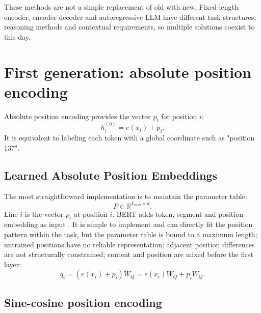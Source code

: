 \documentclass[UTF8,fontset=none,a4paper,10pt]{ctexart}
\newcommand{\R}{\mathbb{R}}
\begin{document}
These methods are not a simple replacement of old with new. Fixed-length encoder, encoder-decoder and autoregressive LLM have different task structures, reasoning methods and contextual requirements, so multiple solutions coexist to this day.

\section{First generation: absolute position encoding}

Absolute position encoding provides the vector $p_i$ for position $i$:
\begin{equation}
  h_i^{(0)}=e(x_i)+p_i.
  \label{en:eq:absolute}
\end{equation}
It is equivalent to labeling each token with a global coordinate such as "position 137".

\subsection{Learned Absolute Position Embeddings}

The most straightforward implementation is to maintain the parameter table:
\begin{equation}
  P\in\R^{L_{\max}\times d}.
  \label{en:eq:learned-table}
\end{equation}
Line $i$ is the vector $p_i$ at position $i$. BERT adds token, segment and position embedding as input \cite{en:devlin2019}. It is simple to implement and can directly fit the position pattern within the task, but the parameter table is bound to a maximum length; untrained positions have no reliable representation; adjacent position differences are not structurally constrained; content and position are mixed before the first layer:
\begin{equation}
  q_i=(e(x_i)+p_i)W_Q=e(x_i)W_Q+p_iW_Q.
  \label{en:eq:absolute-proj}
\end{equation}

\subsection{Sine-cosine position encoding}
\end{document}
